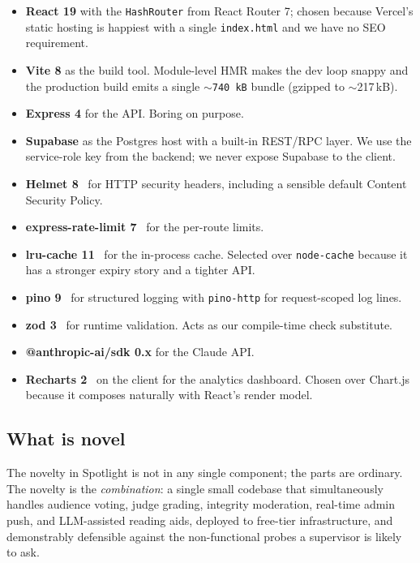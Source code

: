 \begin{itemize}[leftmargin=*]
  \item \textbf{React 19} with the \texttt{HashRouter} from React Router 7; chosen
        because Vercel's static hosting is happiest with a single
        \texttt{index.html} and we have no SEO requirement.
  \item \textbf{Vite 8} as the build tool. Module-level HMR makes the dev loop
        snappy and the production build emits a single
        \texttt{$\sim$740\,kB} bundle (gzipped to $\sim$217\,kB).
  \item \textbf{Express 4} for the API. Boring on purpose.
  \item \textbf{Supabase} as the Postgres host with a built-in REST/RPC layer.
        We use the service-role key from the backend; we never expose Supabase
        to the client.
  \item \textbf{Helmet 8}~\cite{helmet} for HTTP security headers, including a
        sensible default Content Security Policy.
  \item \textbf{express-rate-limit 7}~\cite{erl} for the per-route limits.
  \item \textbf{lru-cache 11}~\cite{lru-cache} for the in-process cache.
        Selected over \texttt{node-cache} because it has a stronger expiry
        story and a tighter API.
  \item \textbf{pino 9}~\cite{pino} for structured logging with
        \texttt{pino-http} for request-scoped log lines.
  \item \textbf{zod 3}~\cite{zod} for runtime validation. Acts as our
        compile-time check substitute.
  \item \textbf{@anthropic-ai/sdk 0.x} for the Claude API.
  \item \textbf{Recharts 2}~\cite{recharts} on the client for the analytics
        dashboard. Chosen over Chart.js because it composes naturally with
        React's render model.
\end{itemize}

\subsection{What is novel}

The novelty in Spotlight is not in any single component; the parts are
ordinary. The novelty is the \emph{combination}: a single small codebase
that simultaneously handles audience voting, judge grading, integrity
moderation, real-time admin push, and LLM-assisted reading aids, deployed
to free-tier infrastructure, and demonstrably defensible against the
non-functional probes a supervisor is likely to ask.
